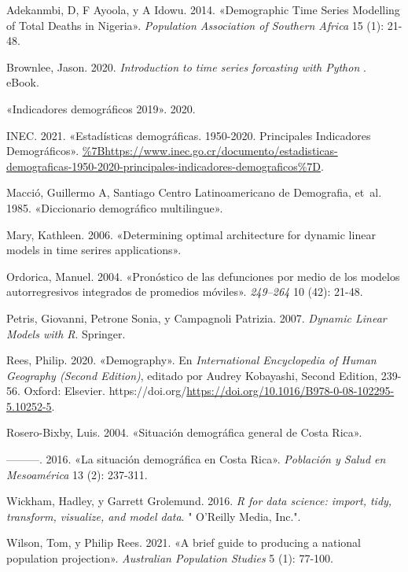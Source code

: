 \documentclass[
  letterpaper,
  onepage,
  openany]{report}
\newlength{\cslhangindent}
\newlength{\cslentryspacingunit} %
\newenvironment{CSLReferences}[2] %
 {%
  \setlength{\parindent}{0pt}
  \ifodd #1
  \let\oldpar\par
  \def\par{\hangindent=\cslhangindent\oldpar}
  \fi
  \setlength{\parskip}{#2\cslentryspacingunit}
 }%
 {}
\begin{document}
\hypertarget{refs}{}
\begin{CSLReferences}{1}{0}
\leavevmode{}%
Adekanmbi, D, F Ayoola, y A Idowu. 2014. {«Demographic Time Series
Modelling of Total Deaths in Nigeria»}. \emph{Population Association of
Southern Africa} 15 (1): 21-48.

\leavevmode{}%
Brownlee, Jason. 2020. \emph{{Introduction to time series forcasting
with Python }}. eBook.

\leavevmode{}%
{«Indicadores demográficos 2019»}. 2020.

\leavevmode{}%
INEC. 2021. {«{Estadísticas demográficas. 1950-2020. Principales
Indicadores Demográficos}»}.
\url{\%7Bhttps://www.inec.go.cr/documento/estadisticas-demograficas-1950-2020-principales-indicadores-demograficos\%7D}.

\leavevmode{}%
Macció, Guillermo A, Santiago Centro Latinoamericano de Demografia,
et~al. 1985. {«Diccionario demogr{á}fico multilingue»}.

\leavevmode{}%
Mary, Kathleen. 2006. {«Determining optimal architecture for dynamic
linear models in time serires applications»}.

\leavevmode{}%
Ordorica, Manuel. 2004. {«Pronóstico de las defunciones por medio de los
modelos autorregresivos integrados de promedios móviles»}.
\emph{249--264} 10 (42): 21-48.

\leavevmode{}%
Petris, Giovanni, Petrone Sonia, y Campagnoli Patrizia. 2007.
\emph{Dynamic Linear Models with R}. Springer.

\leavevmode{}%
Rees, Philip. 2020. {«Demography»}. En \emph{International Encyclopedia
of Human Geography (Second Edition)}, editado por Audrey Kobayashi,
Second Edition, 239-56. Oxford: Elsevier.
https://doi.org/\url{https://doi.org/10.1016/B978-0-08-102295-5.10252-5}.

\leavevmode{}%
Rosero-Bixby, Luis. 2004. {«Situaci{ó}n demogr{á}fica general de Costa
Rica»}.

\leavevmode{}%
---------. 2016. {«{La situaci{ó}n demogr{á}fica en Costa Rica}»}.
\emph{{Poblaci{ó}n y Salud en Mesoam{é}rica}} 13 (2): 237-311.

\leavevmode{}%
Wickham, Hadley, y Garrett Grolemund. 2016. \emph{R for data science:
import, tidy, transform, visualize, and model data}. " O'Reilly Media,
Inc.".

\leavevmode{}%
Wilson, Tom, y Philip Rees. 2021. {«A brief guide to producing a
national population projection»}. \emph{Australian Population Studies} 5
(1): 77-100.

\end{CSLReferences}
\end{document}
